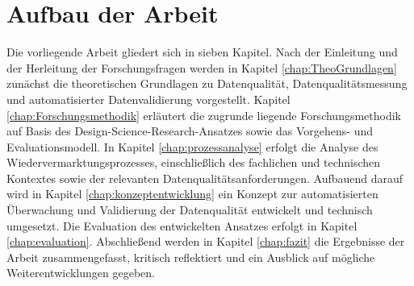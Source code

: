 \documentclass[../main.tex]{subfiles}
\begin{document}
\section{Aufbau der Arbeit}

Die vorliegende Arbeit gliedert sich in sieben Kapitel. Nach der Einleitung und der Herleitung der Forschungsfragen werden in Kapitel \ref{chap:TheoGrundlagen} zunächst die theoretischen Grundlagen zu Datenqualität, Datenqualitätsmessung und automatisierter Datenvalidierung vorgestellt. Kapitel \ref{chap:Forschungsmethodik} erläutert die zugrunde liegende Forschungsmethodik auf Basis des Design-Science-Research-Ansatzes sowie das Vorgehens- und Evaluationsmodell. In Kapitel \ref{chap:prozessanalyse} erfolgt die Analyse des Wiedervermarktungsprozesses, einschließlich des fachlichen und technischen Kontextes sowie der relevanten Datenqualitätsanforderungen. Aufbauend darauf wird in Kapitel \ref{chap:konzeptentwicklung} ein Konzept zur automatisierten Überwachung und Validierung der Datenqualität entwickelt und technisch umgesetzt. Die Evaluation des entwickelten Ansatzes erfolgt in Kapitel \ref{chap:evaluation}. Abschließend werden in Kapitel \ref{chap:fazit} die Ergebnisse der Arbeit zusammengefasst, kritisch reflektiert und ein Ausblick auf mögliche Weiterentwicklungen gegeben.
\end{document}
